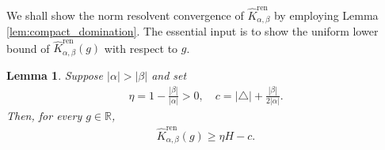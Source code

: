 \documentclass[12pt,dvipdfmx]{article}
\newtheorem{lemma}[theorem]{Lemma}
\newcommand{\RR}{\mathbb{R}}
\begin{document}
We shall show the norm resolvent convergence of $\hat{K}_{\alpha,\beta}^\mathrm{ren} $ by employing 
Lemma \ref{lem:compact_domination}. 
The essential input is to show the uniform lower bound of $\hat{K}_{\alpha,\beta}^{\mathrm{ren} }(g)$ with respect to $g$. 
%
\begin{lemma}\label{prop:uniform-lower-bound}
Suppose $|\alpha|>|\beta|$ and set
\begin{align}\label{c}
    \eta = 1 - \frac{|\beta|}{|\alpha|} > 0,
    \quad
    c = |\triangle| + \frac{|\beta|}{2|\alpha|}. 
\end{align}
Then, for every $g\in\RR$,
\begin{align}\label{eq:uniform-lower-bound}
    \hat{K}_{\alpha,\beta}^{\mathrm{ren} }(g)
    \ge
    \eta H - c.
\end{align}
\end{lemma}
%
\end{document}
